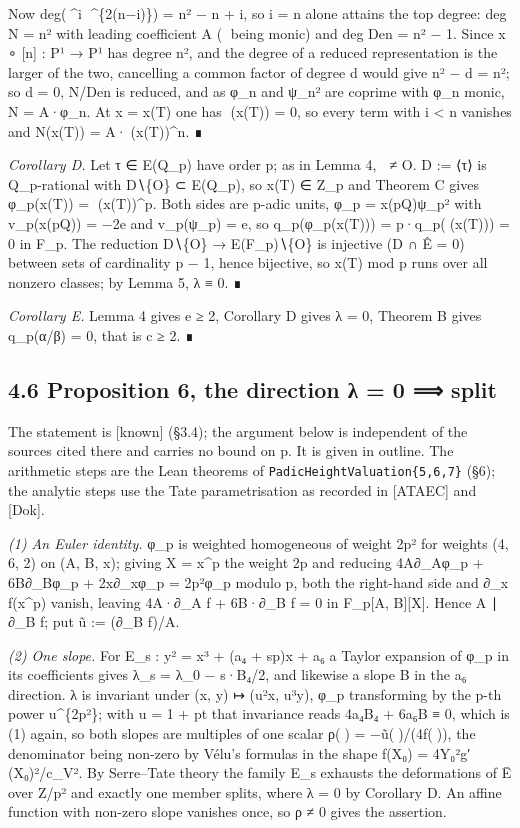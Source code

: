 \documentclass[11pt,a4paper]{article}
\theoremstyle{named}
\begin{document}
Now deg(\textasciicircum{}i \textasciicircum{}\{2(n−i)\}) = n² − n + i, so i = n alone attains the top degree: deg N = n² with leading coefficient A ( being monic) and deg Den = n² − 1. Since x ∘ [n] : P¹ → P¹ has degree n², and the degree of a reduced representation is the larger of the two, cancelling a common factor of degree d would give n² − d = n²; so d = 0, N/Den is reduced, and as φ\_n and ψ\_n² are coprime with φ\_n monic, N = A·φ\_n. At x = x(T) one has (x(T)) = 0, so every term with i \textless{} n vanishes and N(x(T)) = A·(x(T))\textasciicircum{}n. ∎

\textit{Corollary D.} Let τ ∈ E(Q\_p) have order p; as in Lemma 4,  ≠ O. D := ⟨τ⟩ is Q\_p-rational with D∖\{O\} ⊂ E(Q\_p), so x(T) ∈ Z\_p and Theorem C gives φ\_p(x(T)) = (x(T))\textasciicircum{}p. Both sides are p-adic units, φ\_p = x(pQ)ψ\_p² with v\_p(x(pQ)) = −2e and v\_p(ψ\_p) = e, so q\_p(φ\_p(x(T))) = p·q\_p((x(T))) = 0 in F\_p. The reduction D∖\{O\} → E(F\_p)∖\{O\} is injective (D ∩ Ê = 0) between sets of cardinality p − 1, hence bijective, so x(T) mod p runs over all nonzero classes; by Lemma 5, λ ≡ 0. ∎

\textit{Corollary E.} Lemma 4 gives e ≥ 2, Corollary D gives λ = 0, Theorem B gives q\_p(α/β) = 0, that is c ≥ 2. ∎

\subsection*{4.6 Proposition 6, the direction λ = 0 ⟹ split}

The statement is [known] (§3.4); the argument below is independent of the sources cited there and carries no bound on p. It is given in outline. The arithmetic steps are the Lean theorems of \texttt{PadicHeightValuation\{5,6,7\}} (§6); the analytic steps use the Tate parametrisation as recorded in [ATAEC] and [Dok].

\textit{(1) An Euler identity.} φ\_p is weighted homogeneous of weight 2p² for weights (4, 6, 2) on (A, B, x); giving X = x\textasciicircum{}p the weight 2p and reducing 4A∂\_Aφ\_p + 6B∂\_Bφ\_p + 2x∂\_xφ\_p = 2p²φ\_p modulo p, both the right-hand side and ∂\_x f(x\textasciicircum{}p) vanish, leaving 4A·∂\_A f + 6B·∂\_B f = 0 in F\_p[A, B][X]. Hence A ∣ ∂\_B f; put ũ := (∂\_B f)/A.

\textit{(2) One slope.} For E\_s : y² = x³ + (a₄ + sp)x + a₆ a Taylor expansion of φ\_p in its coefficients gives λ\_s = λ\_0 − s·B₄/2, and likewise a slope B in the a₆ direction. λ is invariant under (x, y) ↦ (u²x, u³y), φ\_p transforming by the p-th power u\textasciicircum{}\{2p²\}; with u = 1 + pt that invariance reads 4a₄B₄ + 6a₆B ≡ 0, which is (1) again, so both slopes are multiples of one scalar ρ() = −ũ()/(4f()), the denominator being non-zero by Vélu's formulas in the shape f(X₀) = 4Y₀²g′(X₀)²/c\_V². By Serre–Tate theory the family E\_s exhausts the deformations of Ē over Z/p² and exactly one member splits, where λ = 0 by Corollary D. An affine function with non-zero slope vanishes once, so ρ ≠ 0 gives the assertion.
\end{document}
